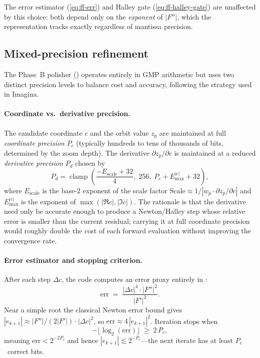 The error estimator (\cref{eq:ff-err}) and Halley gate
(\cref{eq:ff-halley-gate}) are unaffected by this choice: both depend
only on the \emph{exponent} of $|F''|$, which the 
representation tracks exactly regardless of mantissa precision.

\subsection{Mixed-precision refinement}
\label{subsec:ff-mixed-prec}

The Phase~B polisher () operates entirely in GMP
 arithmetic but uses two distinct precision levels to balance cost
and accuracy, following the strategy used in Imagina.

\paragraph{Coordinate vs.\ derivative precision.}
The candidate coordinate $c$ and the orbit value $z_p$ are maintained at full
\emph{coordinate precision} $P_c$ (typically hundreds to tens of thousands of
bits, determined by the zoom depth).  The derivative
$\partial z_p/\partial c$ is maintained at a reduced \emph{derivative
precision} $P_d$ chosen by
\begin{equation}\label{eq:ff-deriv-prec}
P_d = \operatorname{clamp}\!\left(
  \frac{-E_{\mathrm{scale}} + 32}{4},\;
  256,\;
  P_c + E_{\max}^{|c|} + 32
\right),
\end{equation}
where $E_{\mathrm{scale}}$ is the base-2 exponent of the scale factor
$\text{Scale} \approx 1/|w_p \cdot \partial z_p/\partial c|$ and
$E_{\max}^{|c|}$ is the exponent of $\max(|\Re c|,|\Im c|)$.
The rationale is that the derivative need only be accurate enough to produce
a Newton/Halley step whose relative error is smaller than the current
residual; carrying it at full coordinate precision would roughly double the
cost of each forward evaluation without improving the convergence rate.

\paragraph{Error estimator and stopping criterion.}
After each step $\Delta c$, the code computes an error proxy entirely in
:
\begin{equation}\label{eq:ff-err}
\mathrm{err} \;=\;
  \frac{|\Delta c|^4 \cdot |F''|^2}{|F'|^2}.
\end{equation}
Near a simple root the classical Newton error bound gives
$|e_{k+1}| \approx |F''|/(2|F'|) \cdot |\Delta c|^2$,
so $\mathrm{err} \approx 4\,|e_{k+1}|^2$.
Iteration stops when
\begin{equation}\label{eq:ff-stop}
-\lfloor \log_2(\mathrm{err}) \rfloor \;\ge\; 2\,P_c,
\end{equation}
meaning $\mathrm{err} < 2^{-2P_c}$ and hence
$|e_{k+1}| \lesssim 2^{-P_c}$---the next iterate has at least $P_c$~correct
bits.

